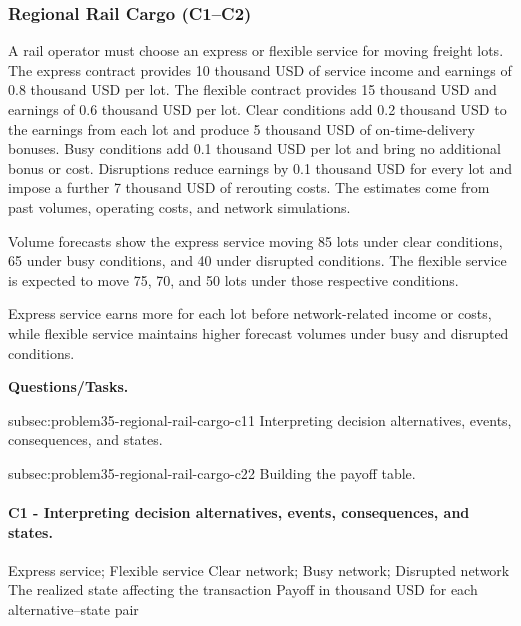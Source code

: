 	
	\subsubsection{Regional Rail Cargo (C1--C2)}
	\label{sec:problem35-regional-rail-cargo-c1-c2}
	
	A rail operator must choose an express or flexible service for moving freight lots. The express contract provides 10 thousand USD of service income and earnings of 0.8 thousand USD per lot. The flexible contract provides 15 thousand USD and earnings of 0.6 thousand USD per lot. Clear conditions add 0.2 thousand USD to the earnings from each lot and produce 5 thousand USD of on-time-delivery bonuses. Busy conditions add 0.1 thousand USD per lot and bring no additional bonus or cost. Disruptions reduce earnings by 0.1 thousand USD for every lot and impose a further 7 thousand USD of rerouting costs. The estimates come from past volumes, operating costs, and network simulations.
	
	Volume forecasts show the express service moving 85 lots under clear conditions, 65 under busy conditions, and 40 under disrupted conditions. The flexible service is expected to move 75, 70, and 50 lots under those respective conditions.
	
	Express service earns more for each lot before network-related income or costs, while flexible service maintains higher forecast volumes under busy and disrupted conditions.

	\textbf{Questions/Tasks.}
	\begin{enumerate}
	\CriterionTask
	{subsec:problem35-regional-rail-cargo-c1}{1}
	{Interpreting decision alternatives, events, consequences, and states.}

	\CriterionTask
	{subsec:problem35-regional-rail-cargo-c2}{2}
	{Building the payoff table.}
	\end{enumerate}

\paragraph*{C1 - Interpreting decision alternatives, events, consequences, and states.}
	\label{subsec:problem35-regional-rail-cargo-c1}
	\DecisionElementsTable
	{Express service; Flexible service}
	{Clear network; Busy network; Disrupted network}
	{The realized state affecting the transaction}
	{Payoff in thousand USD for each alternative--state pair}

